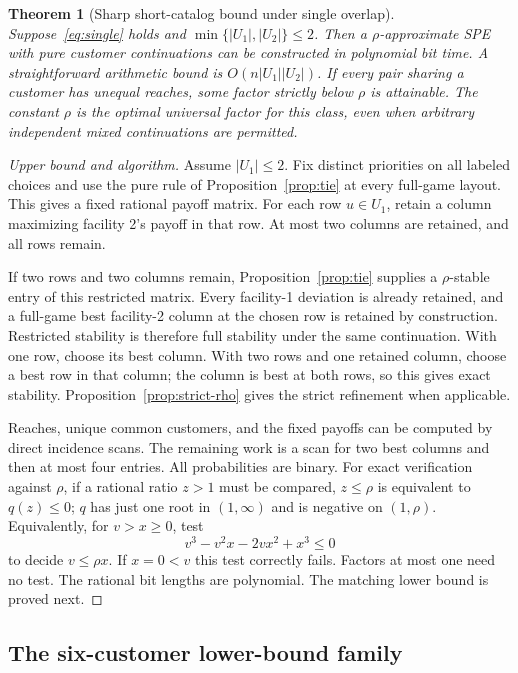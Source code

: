 \documentclass[11pt]{article}
\newtheorem{theorem}{Theorem}[section]
\theoremstyle{definition}
\theoremstyle{remark}
\newcommand{\rhoG}{\rho}
\newcommand{\Uone}{U_1}
\newcommand{\Utwo}{U_2}
\begin{document}
\begin{theorem}[Sharp short-catalog bound under single overlap]\label{thm:rho}
Suppose~\eqref{eq:single} holds and $\min\{|\Uone|,|\Utwo|\}\le2$. Then a $\rhoG$-approximate SPE with pure customer continuations can be constructed in polynomial bit time. A straightforward arithmetic bound is $O(n|\Uone||\Utwo|)$. If every pair sharing a customer has unequal reaches, some factor strictly below $\rhoG$ is attainable. The constant $\rhoG$ is the optimal universal factor for this class, even when arbitrary independent mixed continuations are permitted.
\end{theorem}
\begin{proof}[Upper bound and algorithm]
Assume $|\Uone|\le2$. Fix distinct priorities on all labeled choices and use the pure rule of Proposition~\ref{prop:tie} at every full-game layout. This gives a fixed rational payoff matrix. For each row $u\in\Uone$, retain a column maximizing facility 2's payoff in that row. At most two columns are retained, and all rows remain.

If two rows and two columns remain, Proposition~\ref{prop:tie} supplies a $\rhoG$-stable entry of this restricted matrix. Every facility-1 deviation is already retained, and a full-game best facility-2 column at the chosen row is retained by construction. Restricted stability is therefore full stability under the same continuation. With one row, choose its best column. With two rows and one retained column, choose a best row in that column; the column is best at both rows, so this gives exact stability. Proposition~\ref{prop:strict-rho} gives the strict refinement when applicable.

Reaches, unique common customers, and the fixed payoffs can be computed by direct incidence scans. The remaining work is a scan for two best columns and then at most four entries. All probabilities are binary. For exact verification against $\rhoG$, if a rational ratio $z>1$ must be compared, $z\le\rhoG$ is equivalent to $q(z)\le0$; $q$ has just one root in $(1,\infty)$ and is negative on $(1,\rhoG)$. Equivalently, for $v>x\ge0$, test
\[
 v^3-v^2x-2vx^2+x^3\le0
\]
to decide $v\le\rhoG x$. If $x=0<v$ this test correctly fails. Factors at most one need no test. The rational bit lengths are polynomial. The matching lower bound is proved next.
\end{proof}

\subsection{The six-customer lower-bound family}\label{sec:lower}
\end{document}
